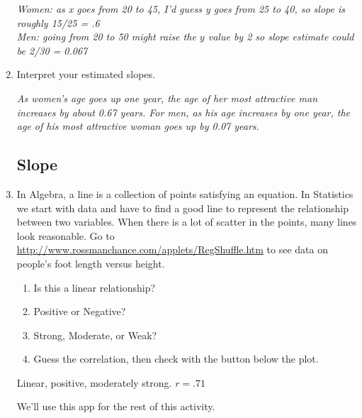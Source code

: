 \begin{enumerate}
\begin{key}
  {\it Women: as x goes from 20 to 45, I'd guess y goes from 25 to 40,
    so slope is roughly 15/25 = .6\\
        Men: going from 20 to 50 might raise the $y$ value by 2 so
        slope estimate could be 2/30 = 0.067  }
\end{key}

\item Interpret your estimated slopes.
\begin{students}
 \vspace{2cm}      
\end{students}

\begin{key}
  {\it  As women's age goes up one year, the age of her most
    attractive man increases by about 0.67 years.  For men, as his age
  increases by one year, the age of his most attractive woman goes up
  by 0.07 years.}
\end{key}



\subsection { Slope}


\item  In Algebra, a line is a collection of points satisfying an
     equation. In Statistics we start with data and have to find a good
     line to represent the relationship between two variables.  When
     there is a lot of scatter in the points, many lines look
     reasonable.  Go to 
     \url{http://www.rossmanchance.com/applets/RegShuffle.htm}
     to see data on people's foot length versus height.
     \begin{enumerate}
     \item Is this a linear relationship? \\
     \item Positive or Negative? \\
     \item Strong, Moderate, or Weak? \\
     \item Guess the correlation, then check with the button below the
       plot.
     \end{enumerate}
\begin{key}
 Linear, positive, moderately strong.      $ r = .71$  
\end{key}

   We'll use this app for the rest of this activity.


\end{enumerate}
